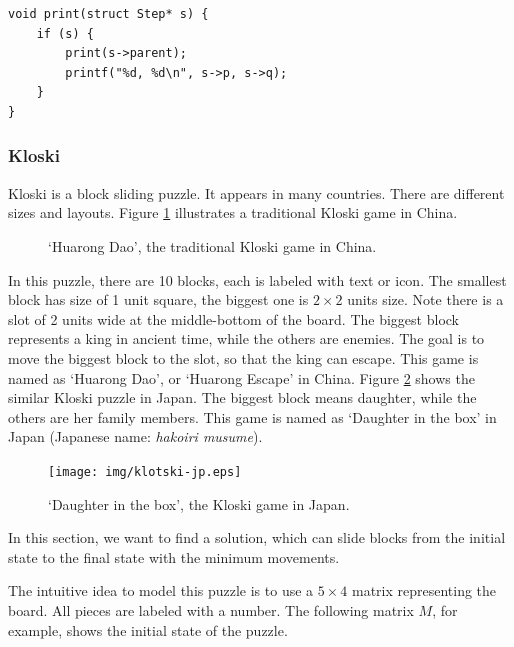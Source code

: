 \documentclass[UTF8]{article}
\begin{document}
\lstset{language=C}
\begin{lstlisting}
void print(struct Step* s) {
    if (s) {
        print(s->parent);
        printf("%d, %d\n", s->p, s->q);
    }
}
\end{lstlisting}

\subsubsection{Kloski}
Kloski is a block sliding puzzle. It appears in many countries. There are different
sizes and layouts. Figure \ref{fig:klotski-cn} illustrates a traditional Kloski game in China.

\begin{figure}[htbp]
 \centering
  \hspace{.01\textwidth}
 \caption{`Huarong Dao', the traditional Kloski game in China.}
 \label{fig:klotski-cn}
\end{figure}

In this puzzle, there are 10 blocks, each is labeled with text or icon. The smallest block has
size of 1 unit square, the biggest one is $2 \times 2$ units size. Note there is a slot of 2 units
wide at the middle-bottom of the board. The biggest block represents a king in ancient time, while
the others are enemies. The goal is to move the biggest block to the slot, so
that the king can escape. This game is named as `Huarong Dao', or `Huarong Escape' in China.
Figure \ref{fig:klotski-jp} shows the similar Kloski puzzle in Japan. The biggest block means
daughter, while the others are her family members. This game is named as `Daughter in the box'
in Japan (Japanese name: {\em hakoiri musume}).

\begin{figure}[htbp]
 \centering
 \texttt{[image: img/klotski-jp.eps]}
 \caption{`Daughter in the box', the Kloski game in Japan.}
 \label{fig:klotski-jp}
\end{figure}

In this section, we want to find a solution, which can slide blocks from the initial state to
the final state with the minimum movements.

The intuitive idea to model this puzzle is to use a $5 \times 4$ matrix representing the
board. All pieces are labeled with a number. The following matrix $M$, for example,
shows the initial state of the puzzle.
\end{document}
